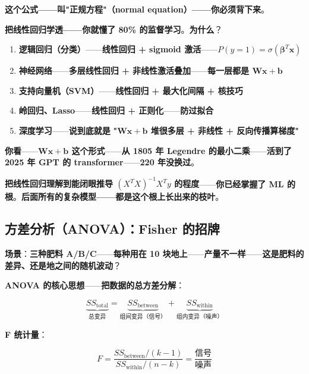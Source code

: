\textbf{这个公式——叫"正规方程"（normal equation）——你必须背下来}。

\begin{tcolorbox}[colback=blue!5, colframe=blue!70!black, title={\textbf{核心洞察：线性回归 = 所有 ML 的种子}}]
\textbf{把线性回归学透——你就懂了 80\% 的监督学习}。\textbf{为什么}？

\begin{enumerate}
\item \textbf{逻辑回归（分类）}——\textbf{线性回归 + sigmoid 激活}——\textbf{$P(y=1) = \sigma(\boldsymbol{\beta}^T \mathbf{x})$}
\item \textbf{神经网络}——\textbf{多层线性回归 + 非线性激活叠加}——\textbf{每一层都是 $\mathbf{Wx} + \mathbf{b}$}
\item \textbf{支持向量机（SVM）}——\textbf{线性回归 + 最大化间隔 + 核技巧}
\item \textbf{岭回归、Lasso}——\textbf{线性回归 + 正则化}——\textbf{防过拟合}
\item \textbf{深度学习}——\textbf{说到底就是} \textbf{"$\mathbf{Wx} + \mathbf{b}$ 堆很多层 + 非线性 + 反向传播算梯度"}
\end{enumerate}

\textbf{你看}——\textbf{$\mathbf{Wx} + \mathbf{b}$ 这个形式}——\textbf{从 1805 年 Legendre 的最小二乘}——\textbf{活到了 2025 年 GPT 的 transformer}——\textbf{220 年没换过}。

\textbf{把线性回归理解到能闭眼推导 $(X^T X)^{-1} X^T y$ 的程度}——\textbf{你已经掌握了 ML 的根}。\textbf{后面所有的复杂模型——都是这个根上长出来的枝叶}。
\end{tcolorbox}

\subsection{方差分析（ANOVA）：Fisher 的招牌}

\textbf{场景}：\textbf{三种肥料 A/B/C}——\textbf{每种用在 10 块地上}——\textbf{产量不一样}——\textbf{这是肥料的差异、还是地之间的随机波动}？

\textbf{ANOVA 的核心思想}——\textbf{把数据的总方差分解}：

\begin{equation}
\underbrace{SS_{\text{total}}}_{\text{总变异}} = \underbrace{SS_{\text{between}}}_{\text{组间变异（信号）}} + \underbrace{SS_{\text{within}}}_{\text{组内变异（噪声）}}
\end{equation}

\textbf{F 统计量}：

\begin{equation}
F = \frac{SS_{\text{between}}/(k-1)}{SS_{\text{within}}/(n-k)} = \frac{\text{信号}}{\text{噪声}}
\end{equation}

